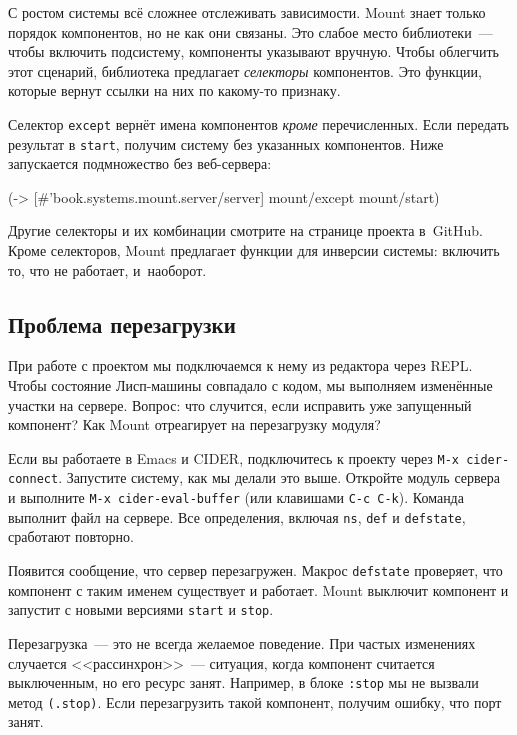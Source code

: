 С ростом системы всё сложнее отслеживать зависимости. Mount знает только порядок
компонентов, но не как они связаны. Это слабое место библиотеки~--- чтобы
включить подсистему, компоненты указывают вручную. Чтобы облегчить этот
сценарий, библиотека предлагает \emph{селекторы} компонентов. Это функции,
которые вернут ссылки на них по какому-то признаку.

Селектор \verb|except| вернёт имена компонентов \emph{кроме}
перечисленных. Если передать результат в \verb|start|, получим систему без
указанных компонентов. Ниже запускается подмножество без веб-сервера:

\begin{english}
  \begin{clojure}
(-> [#'book.systems.mount.server/server]
    mount/except
    mount/start)
  \end{clojure}
\end{english}

Другие селекторы и их комбинации смотрите на странице проекта в~GitHub. Кроме
селекторов, Mount предлагает функции для инверсии системы: включить то, что не
работает, и~наоборот.

\subsection{Проблема перезагрузки}

При работе с проектом мы подключаемся к нему из редактора через REPL. Чтобы
состояние Лисп-машины совпадало с кодом, мы выполняем изменённые участки на
сервере. Вопрос: что случится, если исправить уже запущенный компонент? Как
Mount отреагирует на перезагрузку модуля?


Если вы работаете в Emacs и CIDER, подключитесь к проекту через
\verb|M-x cider-connect|. Запустите систему, как мы делали это выше.
Откройте модуль сервера и выполните \verb|M-x cider-eval-buffer|
(или клавишами \verb|C-c C-k|). Команда выполнит файл на сервере.
Все определения, включая \verb|ns|, \verb|def| и \verb|defstate|,
сработают повторно.

Появится сообщение, что сервер перезагружен. Макрос \verb|defstate| проверяет,
что компонент с таким именем существует и работает. Mount выключит компонент и
запустит с новыми версиями \verb|start| и \verb|stop|.

Перезагрузка~--- это не всегда желаемое поведение. При частых изменениях случается
<<рассинхрон>>~--- ситуация, когда компонент считается выключенным, но его
ресурс занят. Например, в блоке \verb|:stop| мы не вызвали метод
\verb|(.stop)|. Если перезагрузить такой компонент, получим ошибку, что порт
занят.

